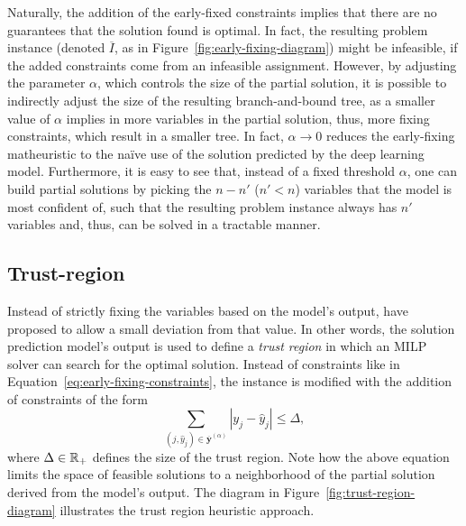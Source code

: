 Naturally, the addition of the early-fixed constraints implies that there are no guarantees that the solution found is optimal.
In fact, the resulting problem instance (denoted $\overline{I}$, as in Figure~\ref{fig:early-fixing-diagram}) might be infeasible, if the added constraints come from an infeasible assignment.
However, by adjusting the parameter $\alpha$, which controls the size of the partial solution, it is possible to indirectly adjust the size of the resulting branch-and-bound tree, as a smaller value of $\alpha$ implies in more variables in the partial solution, thus, more fixing constraints, which result in a smaller tree. 
In fact, $\alpha\to 0$ reduces the early-fixing matheuristic to the naïve use of the solution predicted by the deep learning model.
Furthermore, it is easy to see that, instead of a fixed threshold $\alpha$, one can build partial solutions by picking the $n-n'$ ($n' < n$) variables that the model is most confident of, such that the resulting problem instance always has $n'$ variables and, thus, can be solved in a tractable manner.


\subsection{Trust-region}

Instead of strictly fixing the variables based on the model's output,  have proposed to allow a small deviation from that value.
In other words, the solution prediction model's output is used to define a \emph{trust region} in which an MILP solver can search for the optimal solution.
Instead of constraints like in Equation~\eqref{eq:early-fixing-constraints}, the instance is modified with the addition of constraints of the form
\begin{equation}\label{eq:trust-region-constraint}
    \sum_{(j,\hat{y}_j) \in \overline{\bm{y}}^{(\alpha)}} |y_{j} - \hat{y}_j| \le \Delta
,\end{equation}
where $\Delta \in \mathbb{R}_+$ defines the size of the trust region.
Note how the above equation limits the space of feasible solutions to a neighborhood of the partial solution derived from the model's output.
The diagram in Figure~\ref{fig:trust-region-diagram} illustrates the trust region heuristic approach.

